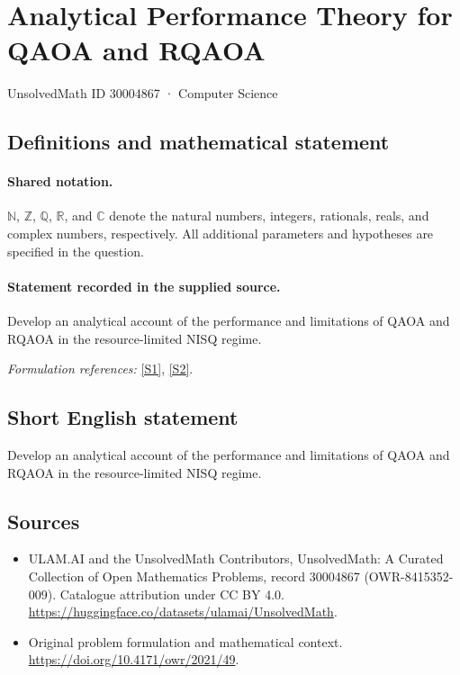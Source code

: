\documentclass[11pt]{article}
\newcommand{\sref}[2]{\hyperlink{source:#1:#2}{[S#2]}}
\begin{document}
\setcounter{section}{30004866}
\section{Analytical Performance Theory for QAOA and RQAOA}\label{30004867}
{\small UnsolvedMath ID 30004867 · Computer Science}
\subsection{Definitions and mathematical statement}

\paragraph{Shared notation.}$\mathbb N$, $\mathbb Z$, $\mathbb Q$, $\mathbb R$, and $\mathbb C$ denote the natural numbers, integers, rationals, reals, and complex numbers, respectively. All additional parameters and hypotheses are specified in the question.


\paragraph{Statement recorded in the supplied source.}
Develop an analytical account of the performance and limitations of QAOA and RQAOA in the resource-limited NISQ regime.
\par\smallskip\textit{Formulation references:} \sref{30004867}{1}, \sref{30004867}{2}.
\subsection{Short English statement}
Develop an analytical account of the performance and limitations of QAOA and RQAOA in the resource-limited NISQ regime.
\subsection{Sources}
\begin{itemize}
\item[\hypertarget{source:30004867:1}{S1}] ULAM.AI and the UnsolvedMath Contributors, UnsolvedMath: A Curated Collection of Open Mathematics Problems, record 30004867 (OWR-8415352-009). Catalogue attribution under CC BY 4.0.
\url{https://huggingface.co/datasets/ulamai/UnsolvedMath}.
\item[\hypertarget{source:30004867:2}{S2}] Original problem formulation and mathematical context.
\url{https://doi.org/10.4171/owr/2021/49}.
\end{itemize}
\label{end:30004867}
\end{document}
